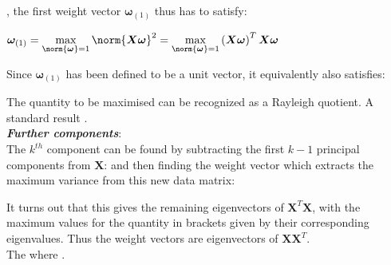 , the first weight vector $\bm{\omega}_{(1)}$ thus has to satisfy:
\begin{center}
$\bm{\omega}_{(1)} = \max\limits_{\norm{\bm{\omega}}=1}\norm{\bm{X}\bm{\omega}}^{2}=
\max\limits_{\norm{\bm{\omega}}=1}\left(\bm{X}\bm{\omega}\right)^{T}\bm{X}\bm{\omega}$
\end{center}
Since $\bm{\omega}_{(1)}$ has been defined to be a unit vector, it equivalently also satisfies:
\begin{center}
\end{center}
The quantity to be maximised can be recognized as a Rayleigh quotient. A standard result .\\

\textbf{\emph{Further components}}:\\
The $k^{th}$ component can be found by subtracting the first $k-1$ principal components from
$\bm{X}$:
and then finding the weight vector which extracts the maximum variance from this new data matrix:
\begin{center}
\end{center}
It turns out that this gives the remaining eigenvectors of $\bm{X}^{T}\bm{X}$, with the maximum 
values for the quantity in brackets given by their corresponding eigenvalues. Thus the weight vectors
are eigenvectors of $\bm{X}\bm{X}^{T}$.\\
The 
where .

